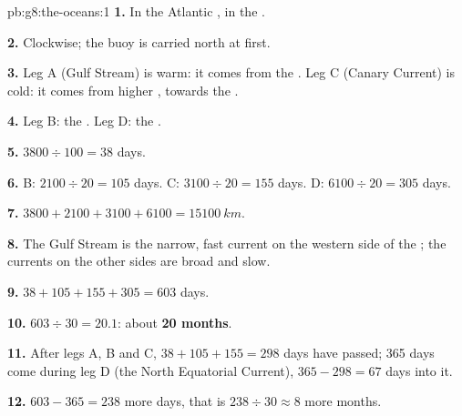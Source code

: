 \begin{solution}{pb:g8:the-oceans:1}
\textbf{1.} In the Atlantic , in the .

\textbf{2.} Clockwise; the buoy is carried north at first.

\textbf{3.} Leg A (Gulf Stream) is warm: it comes from the . Leg C
(Canary Current) is cold: it comes from higher , towards the
.

\textbf{4.} Leg B: the . Leg D: the .

\textbf{5.} $3800 \div 100 = 38$ days.

\textbf{6.} B: $2100 \div 20 = 105$ days. C: $3100 \div 20 = 155$ days.
D: $6100 \div 20 = 305$ days.

\textbf{7.} $3800 + 2100 + 3100 + 6100 = \qty{15100}{km}$.

\textbf{8.} The Gulf Stream is the narrow, fast current on the western
side of the ; the currents on the other sides are broad and slow.

\textbf{9.} $38 + 105 + 155 + 305 = 603$ days.

\textbf{10.} $603 \div 30 = 20.1$: about \textbf{20 months}.

\textbf{11.} After legs A, B and C, $38 + 105 + 155 = 298$ days have
passed; 365 days come during leg D (the North Equatorial Current), $365 -
298 = 67$ days into it.

\textbf{12.} $603 - 365 = 238$ more days, that is $238 \div 30 \approx 8$
more months.
\end{solution}
